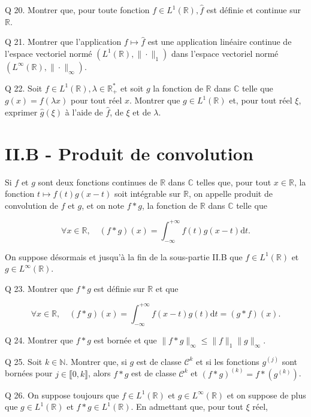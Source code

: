 \documentclass[10pt]{article}
\begin{document}
Q 20. Montrer que, pour toute fonction $f \in L^{1}(\mathbb{R}), \hat{f}$ est définie et continue sur $\mathbb{R}$.

Q 21. Montrer que l'application $f \mapsto \hat{f}$ est une application linéaire continue de l'espace vectoriel normé $\left(L^{1}(\mathbb{R}),\|\cdot\|_{1}\right)$ dans l'espace vectoriel normé $\left(L^{\infty}(\mathbb{R}),\|\cdot\|_{\infty}\right)$.

Q 22. Soit $f \in L^{1}(\mathbb{R}), \lambda \in \mathbb{R}_{+}^{*}$ et soit $g$ la fonction de $\mathbb{R}$ dans $\mathbb{C}$ telle que $g(x)=f(\lambda x)$ pour tout réel $x$. Montrer que $g \in L^{1}(\mathbb{R})$ et, pour tout réel $\xi$, exprimer $\hat{g}(\xi)$ à l'aide de $\hat{f}$, de $\xi$ et de $\lambda$.

\section{II.B - Produit de convolution}
Si $f$ et $g$ sont deux fonctions continues de $\mathbb{R}$ dans $\mathbb{C}$ telles que, pour tout $x \in \mathbb{R}$, la fonction $t \mapsto f(t) g(x-t)$ soit intégrable sur $\mathbb{R}$, on appelle produit de convolution de $f$ et $g$, et on note $f * g$, la fonction de $\mathbb{R}$ dans $\mathbb{C}$ telle que

$$
\forall x \in \mathbb{R}, \quad(f * g)(x)=\int_{-\infty}^{+\infty} f(t) g(x-t) \mathrm{d} t .
$$

On suppose désormais et jusqu'à la fin de la sous-partie II.B que $f \in L^{1}(\mathbb{R})$ et $g \in L^{\infty}(\mathbb{R})$.

Q 23. Montrer que $f * g$ est définie sur $\mathbb{R}$ et que

$$
\forall x \in \mathbb{R}, \quad(f * g)(x)=\int_{-\infty}^{+\infty} f(x-t) g(t) \mathrm{d} t=(g * f)(x) .
$$

Q 24. Montrer que $f * g$ est bornée et que $\|f * g\|_{\infty} \leqslant\|f\|_{1}\|g\|_{\infty}$.

Q 25. Soit $k \in \mathbb{N}$. Montrer que, si $g$ est de classe $\mathcal{C}^{k}$ et si les fonctions $g^{(j)}$ sont bornées pour $j \in \llbracket 0, k \rrbracket$, alors $f * g$ est de classe $\mathcal{C}^{k}$ et $(f * g)^{(k)}=f *\left(g^{(k)}\right)$.

Q 26. On suppose toujours que $f \in L^{1}(\mathbb{R})$ et $g \in L^{\infty}(\mathbb{R})$ et on suppose de plus que $g \in L^{1}(\mathbb{R})$ et $f * g \in L^{1}(\mathbb{R})$. En admettant que, pour tout $\xi$ réel,
\end{document}
